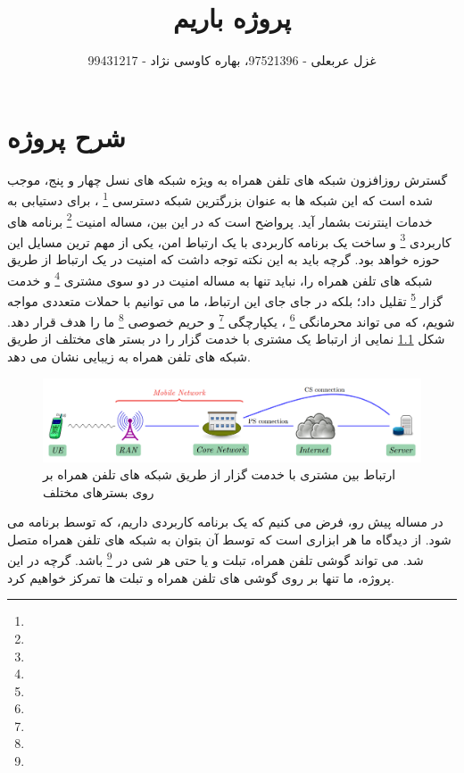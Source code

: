 \documentclass{report}
\title{پروژه باریم
}
\author{غزل عربعلی - 97521396، بهاره کاوسی نژاد - 99431217}
\begin{document}
\maketitle
{}
\chapter{شرح پروژه}


گسترش روزافزون شبکه های تلفن همراه به ویژه شبکه های نسل چهار و پنج، موجب شده است که این شبکه ها به عنوان بزرگترین شبکه دسترسی
\footnote{}
 ، برای دستیابی به خدمات اینترنت بشمار آید. پرواضح است که در این بین، مساله امنیت
 \footnote{}
  برنامه های کاربردی
  \footnote{}
  و ساخت یک برنامه کاربردی با یک ارتباط امن، یکی از مهم ترین مسایل این حوزه خواهد بود. گرچه باید به این نکته توجه داشت که امنیت در یک ارتباط از طریق شبکه های تلفن همراه را، نباید تنها به مساله امنیت در دو سوی مشتری
   \footnote{}
   و خدمت گزار
   \footnote{}
   تقلیل داد؛ بلکه در جای جای این ارتباط، ما می توانیم با حملات متعددی مواجه شویم، که می تواند محرمانگی
   \footnote{}
   ، یکپارچگی
   \footnote{}
    و حریم خصوصی
    \footnote{}
     ما را هدف قرار دهد. شکل 
     \ref{fig:Client_Server}
      نمایی از ارتباط یک مشتری با خدمت گزار را در بستر های مختلف از طریق شبکه های تلفن همراه به زیبایی نشان می دهد.
  
   \begin{figure}[ht]
   	\centering
   	\includegraphics[width=\textwidth]{Pic/Client_Server}
   	\caption{ارتباط بین مشتری با خدمت گزار از طریق شبکه های تلفن همراه بر روی بسترهای مختلف}
   	\label{fig:Client_Server}
   \end{figure}
   
   در مساله پیش رو، فرض می کنیم که یک برنامه کاربردی داریم، که توسط برنامه 
    می شود.
      از دیدگاه ما هر ابزاری است که توسط آن بتوان به شبکه های تلفن همراه متصل شد.
        می تواند گوشی تلفن همراه، تبلت و یا حتی هر شی در
         \footnote{}
          باشد. گرچه در این پروژه، ما تنها بر روی گوشی های تلفن همراه و تبلت ها تمرکز خواهیم کرد.
          
\end{document}
